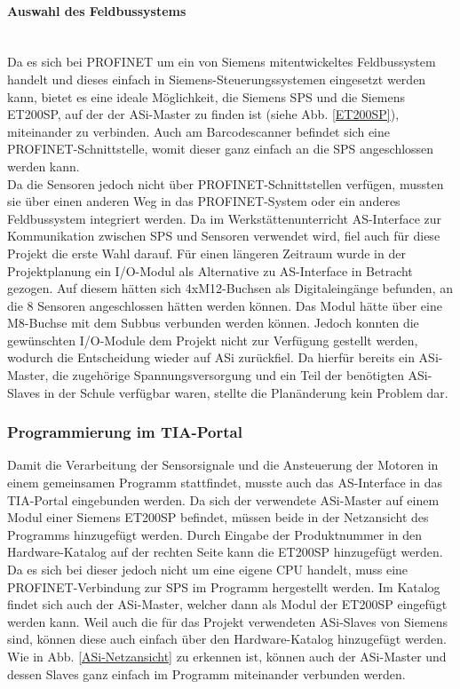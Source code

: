 \paragraph{Auswahl des Feldbussystems}\mbox{}\\
Da es sich bei PROFINET um ein von Siemens mitentwickeltes Feldbussystem handelt und dieses einfach in Siemens-Steuerungssystemen eingesetzt werden kann, bietet es eine ideale Möglichkeit, die Siemens SPS und die Siemens ET200SP, auf der der ASi-Master zu finden ist (siehe Abb. \ref{ET200SP}), miteinander zu verbinden. Auch am Barcodescanner befindet sich eine PROFINET-Schnittstelle, womit dieser ganz einfach an die SPS angeschlossen werden kann.\\
Da die Sensoren jedoch nicht über PROFINET-Schnittstellen verfügen, mussten sie über einen anderen Weg in das PROFINET-System oder ein anderes Feldbussystem integriert werden. Da im Werkstättenunterricht AS-Interface zur Kommunikation zwischen SPS und Sensoren verwendet wird, fiel auch für diese Projekt die erste Wahl darauf. Für einen längeren Zeitraum wurde in der Projektplanung ein I/O-Modul als Alternative zu AS-Interface in Betracht gezogen. Auf diesem hätten sich 4xM12-Buchsen als Digitaleingänge befunden, an die 8 Sensoren angeschlossen hätten werden können. Das Modul hätte über eine M8-Buchse mit dem Subbus verbunden werden können. Jedoch konnten die gewünschten I/O-Module dem Projekt nicht zur Verfügung gestellt werden, wodurch die Entscheidung wieder auf ASi zurückfiel. Da hierfür bereits ein ASi-Master, die zugehörige Spannungsversorgung und ein Teil der benötigten ASi-Slaves in der Schule verfügbar waren, stellte die Planänderung kein Problem dar.

\subsubsection{Programmierung im TIA-Portal}
Damit die Verarbeitung der Sensorsignale und die Ansteuerung der Motoren in einem gemeinsamen Programm stattfindet, musste auch das AS-Interface in das TIA-Portal eingebunden werden. Da sich der verwendete ASi-Master auf einem Modul einer Siemens ET200SP befindet, müssen beide in der Netzansicht des Programms hinzugefügt werden. Durch Eingabe der Produktnummer in den Hardware-Katalog auf der rechten Seite kann die ET200SP hinzugefügt werden. Da es sich bei dieser jedoch nicht um eine eigene CPU handelt, muss eine PROFINET-Verbindung zur SPS im Programm hergestellt werden. Im Katalog findet sich auch der ASi-Master, welcher dann als Modul der ET200SP eingefügt werden kann. Weil auch die für das Projekt verwendeten ASi-Slaves von Siemens sind, können diese auch einfach über den Hardware-Katalog hinzugefügt werden. Wie in Abb. \ref{ASi-Netzansicht} zu erkennen ist, können auch der ASi-Master und dessen Slaves ganz einfach im Programm miteinander verbunden werden.

